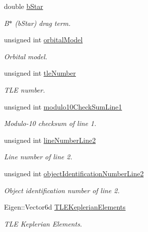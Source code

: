 \begin{DoxyCompactItemize}
double \hyperlink{structtudat_1_1input__output_1_1TwoLineElementData_a32661a991535da8bc35b5156f068ab07}{b\+Star}
\begin{DoxyCompactList}\small\item\em B$\ast$ (b\+Star) drag term. \end{DoxyCompactList}\item 
unsigned int \hyperlink{structtudat_1_1input__output_1_1TwoLineElementData_afc8d0b260a138b058157dcf4056409eb}{orbital\+Model}
\begin{DoxyCompactList}\small\item\em Orbital model. \end{DoxyCompactList}\item 
unsigned int \hyperlink{structtudat_1_1input__output_1_1TwoLineElementData_a1adac809c7a8d18356259a39905f04fc}{tle\+Number}
\begin{DoxyCompactList}\small\item\em T\+LE number. \end{DoxyCompactList}\item 
unsigned int \hyperlink{structtudat_1_1input__output_1_1TwoLineElementData_ae5ad3d8d8e5e589c1ccb317b40443f85}{modulo10\+Check\+Sum\+Line1}
\begin{DoxyCompactList}\small\item\em Modulo-\/10 checksum of line 1. \end{DoxyCompactList}\item 
unsigned int \hyperlink{structtudat_1_1input__output_1_1TwoLineElementData_a4b2bf73802411d362f0ccb5ed7fe31b9}{line\+Number\+Line2}
\begin{DoxyCompactList}\small\item\em Line number of line 2. \end{DoxyCompactList}\item 
unsigned int \hyperlink{structtudat_1_1input__output_1_1TwoLineElementData_a6e47168e40eeb1ec03f2f659783ff0fa}{object\+Identification\+Number\+Line2}
\begin{DoxyCompactList}\small\item\em Object identification number of line 2. \end{DoxyCompactList}\item 
Eigen\+::\+Vector6d \hyperlink{structtudat_1_1input__output_1_1TwoLineElementData_a5bc3d2b995371b44505617256d43c5d9}{T\+L\+E\+Keplerian\+Elements}
\begin{DoxyCompactList}\small\item\em T\+LE Keplerian Elements. \end{DoxyCompactList}\item 

\end{DoxyCompactItemize}
